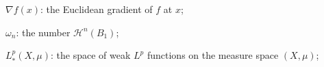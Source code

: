 \documentclass[11pt]{amsart}
\newtheorem{proposition}[theorem]{Proposition}
\theoremstyle{definition}
\newcommand{\HH}{\mathcal{H}}
\newcommand{\R}{\mathbb{R}}
\newcommand{\loc}{\mathrm{loc}}
\newcommand{\fint}{\mathrel{\int\!\!\!\!\!\!-}}
\newcommand{\ssubset}{\subset\subset}
\DeclareMathOperator{\ap}{ap}
\DeclareMathOperator{\aplim}{ap\lim}
\DeclareMathOperator{\lip}{Lip}
\begin{document}



$\nabla f(x)$: the Euclidean gradient of $f$ at $x$;





$\omega_n$: the number $\HH^n(B_1)$;





$L^p_*(X,\mu)$: the space of weak $L^p$ functions on the measure space $(X,\mu)$;






\end{document}
